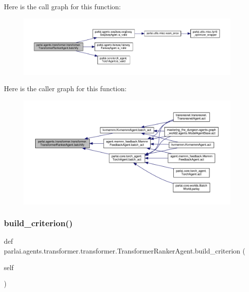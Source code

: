 Here is the call graph for this function\+:
\nopagebreak
\begin{figure}[H]
\begin{center}
\leavevmode
\includegraphics[width=350pt]{classparlai_1_1agents_1_1transformer_1_1transformer_1_1TransformerRankerAgent_a2592aa2dc8469ab671656597b4ba48a8_cgraph}
\end{center}
\end{figure}
Here is the caller graph for this function\+:
\nopagebreak
\begin{figure}[H]
\begin{center}
\leavevmode
\includegraphics[width=350pt]{classparlai_1_1agents_1_1transformer_1_1transformer_1_1TransformerRankerAgent_a2592aa2dc8469ab671656597b4ba48a8_icgraph}
\end{center}
\end{figure}
\mbox{\label{classparlai_1_1agents_1_1transformer_1_1transformer_1_1TransformerRankerAgent_af91ef63ee5c7f7588a75e32587364c80}} 
\subsubsection{\texorpdfstring{build\+\_\+criterion()}{build\_criterion()}}
{\footnotesize\ttfamily def parlai.\+agents.\+transformer.\+transformer.\+Transformer\+Ranker\+Agent.\+build\+\_\+criterion (\begin{DoxyParamCaption}\item[{}]{self }\end{DoxyParamCaption})}

